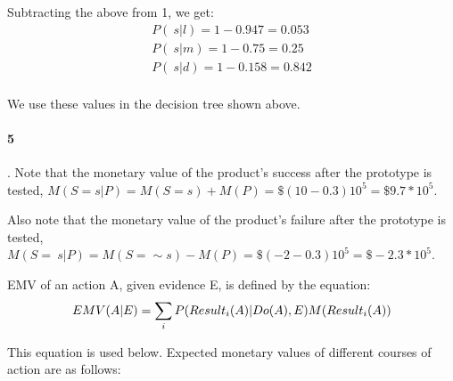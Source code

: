 \documentclass[10pt]{article}
\begin{document}
Subtracting the above from 1, we get:
\begin{eqnarray}
P(~s|l)=1-0.947=0.053\\
P(~s|m)=1-0.75=0.25\\
P(~s|d)=1-0.158=0.842\\
\end{eqnarray}


We use these values in the decision tree shown above.

   \paragraph{5}. Note that the monetary value of the product's success after the prototype is tested, $M(S=s|P)= M(S=s)+M(P) = \$(10-0.3)10^{5} = \$9.7*10^{5}$. 

Also note that the monetary value of the product's failure after the prototype is tested, $M(S=~s|P)= M(S= \sim s)-M(P) = \$(-2-0.3)10^{5} = \$-2.3*10^{5}$. 

EMV of an action A, given evidence E, is defined by the equation: 
\begin{equation}
EMV(A|E)= \sum_{i} P(Result_{i}(A)|Do(A),E)M(Result_{i}(A))\\
\end{equation}

This equation is used below. Expected monetary values of different courses of action are as follows:
\end{document}
